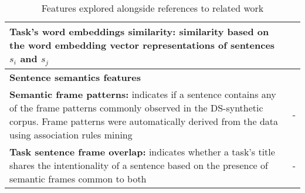 \begin{table}
\begin{small}
\begin{tabular}{lr}
\parbox[l][1.1cm][c]{11cm}{ 
    \textbf{Task's word embeddings similarity:} similarity based on the word embedding vector representations of sentences $s_i$ and $s_j$
} & \cite{Xu2017} \\  

\hline

\parbox[l][0.5cm][c]{11cm}{
    \textbf{Sentence semantics features}
} &  \\ 

\parbox[l][1.6cm][c]{11cm}{ 
    \textbf{Semantic frame patterns:} indicates if a sentence contains any of the  
    frame patterns commonly observed in the \acs{DS-synthetic} corpus. Frame patterns were automatically derived from the data using association rules mining~\cite{Hahsler2005}
} & - \\  

\parbox[l][1.5cm][c]{11cm}{ 
    \textbf{Task sentence frame overlap:} indicates whether a task's title shares the intentionality
    of a sentence based on the presence of semantic frames common to both
} & - \\  

\hline

\end{tabular}
\end{small}
\caption{Features explored alongside references to related work}
\label{tbl:approach-textual-features}
\end{table}

